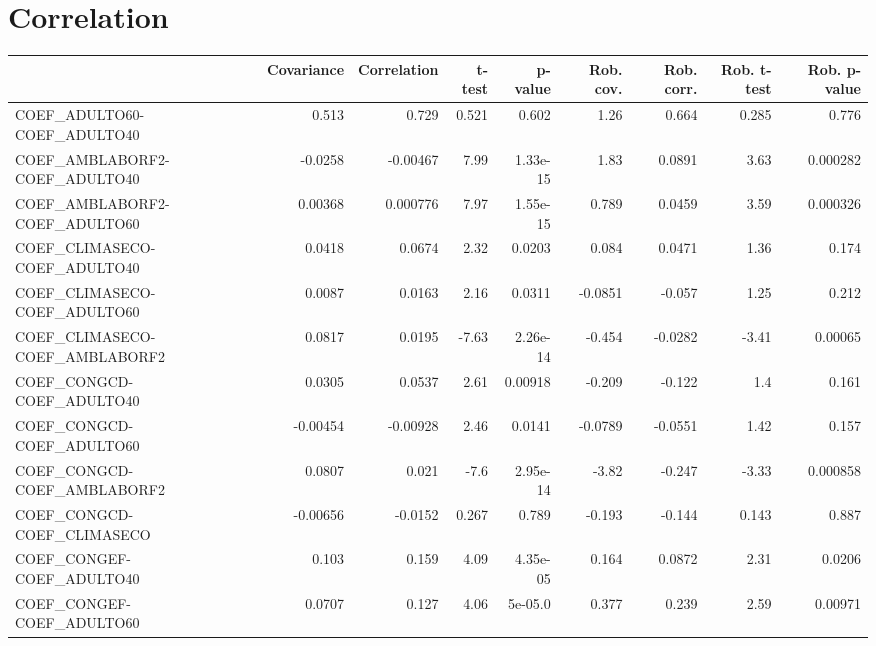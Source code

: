 \section{Correlation}
\begin{tabular}{lrrrrrrrr}
\toprule
{} &  Covariance &  Correlation &   t-test &  p-value &  Rob. cov. &  Rob. corr. &  Rob. t-test &  Rob. p-value \\
\midrule
COEF\_ADULTO60-COEF\_ADULTO40            &       0.513 &        0.729 &    0.521 &    0.602 &       1.26 &       0.664 &        0.285 &         0.776 \\
COEF\_AMBLABORF2-COEF\_ADULTO40          &     -0.0258 &     -0.00467 &     7.99 & 1.33e-15 &       1.83 &      0.0891 &         3.63 &      0.000282 \\
COEF\_AMBLABORF2-COEF\_ADULTO60          &     0.00368 &     0.000776 &     7.97 & 1.55e-15 &      0.789 &      0.0459 &         3.59 &      0.000326 \\
COEF\_CLIMASECO-COEF\_ADULTO40           &      0.0418 &       0.0674 &     2.32 &   0.0203 &      0.084 &      0.0471 &         1.36 &         0.174 \\
COEF\_CLIMASECO-COEF\_ADULTO60           &      0.0087 &       0.0163 &     2.16 &   0.0311 &    -0.0851 &      -0.057 &         1.25 &         0.212 \\
COEF\_CLIMASECO-COEF\_AMBLABORF2         &      0.0817 &       0.0195 &    -7.63 & 2.26e-14 &     -0.454 &     -0.0282 &        -3.41 &       0.00065 \\
COEF\_CONGCD-COEF\_ADULTO40              &      0.0305 &       0.0537 &     2.61 &  0.00918 &     -0.209 &      -0.122 &          1.4 &         0.161 \\
COEF\_CONGCD-COEF\_ADULTO60              &    -0.00454 &     -0.00928 &     2.46 &   0.0141 &    -0.0789 &     -0.0551 &         1.42 &         0.157 \\
COEF\_CONGCD-COEF\_AMBLABORF2            &      0.0807 &        0.021 &     -7.6 & 2.95e-14 &      -3.82 &      -0.247 &        -3.33 &      0.000858 \\
COEF\_CONGCD-COEF\_CLIMASECO             &    -0.00656 &      -0.0152 &    0.267 &    0.789 &     -0.193 &      -0.144 &        0.143 &         0.887 \\
COEF\_CONGEF-COEF\_ADULTO40              &       0.103 &        0.159 &     4.09 & 4.35e-05 &      0.164 &      0.0872 &         2.31 &        0.0206 \\
COEF\_CONGEF-COEF\_ADULTO60              &      0.0707 &        0.127 &     4.06 &  5e-05.0 &      0.377 &       0.239 &         2.59 &       0.00971 \\

\end{tabular}
